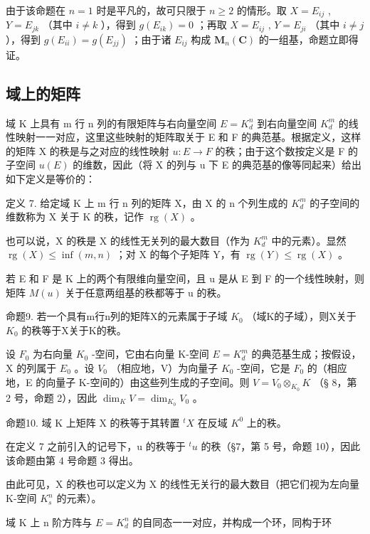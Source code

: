 由于该命题在 \(n = 1\) 时是平凡的，故可只限于 \(n \geqslant 2\) 的情形。取 \(X = E_{ij}\) , \(Y = E_{jk}\) （其中 \(i \neq k\) ），得到 \(g(E_{ik}) = 0\) ；再取 \(X = E_{ij}\) , \(Y = E_{ji}\) （其中 \(i \neq j\) ），得到 \(g(E_{ii}) = g(E_{jj})\) ；由于诸 \(E_{ij}\) 构成 \(\mathbf{M}_n(\mathbf{C})\) 的一组基，命题立即得证。

\subsection{域上的矩阵}

域 K 上具有 m 行 n 列的有限矩阵与右向量空间 \(E = K_{d}^{n}\) 到右向量空间 \(K_{d}^{m}\) 的线性映射一一对应，这里这些映射的矩阵取关于 E 和 F 的典范基。根据定义，这样的矩阵 X 的秩是与之对应的线性映射 \(u: E \to F\) 的秩；由于这个数按定义是 F 的子空间 \(u(E)\) 的维数，因此（将 X 的列与 u 下 E 的典范基的像等同起来）给出如下定义是等价的：

定义 7. 给定域 K 上 m 行 n 列的矩阵 X，由 X 的 n 个列生成的 \(K_{d}^{m}\) 的子空间的维数称为 X 关于 K 的秩，记作 \(\operatorname{rg}(X)\) 。

也可以说，X 的秩是 X 的线性无关列的最大数目（作为 \(K_{d}^{m}\) 中的元素）。显然 \(\operatorname{rg}(X) \leqslant \inf(m, n)\) ；对 X 的每个子矩阵 Y，有 \(\operatorname{rg}(Y) \leqslant \operatorname{rg}(X)\) 。

若 E 和 F 是 K 上的两个有限维向量空间，且 u 是从 E 到 F 的一个线性映射，则矩阵 \(M(u)\) 关于任意两组基的秩都等于 u 的秩。

命题9. 若一个具有m行n列的矩阵X的元素属于子域 \(K_{0}\) （域K的子域），则X关于 \(K_{0}\) 的秩等于X关于K的秩。

设 \(F_{0}\) 为右向量 \(K_{0}\) -空间，它由右向量 K-空间 \(E = K_{d}^{m}\) 的典范基生成；按假设，X 的列属于 \(E_{0}\) 。设 \(V_{0}\) （相应地，V）为向量子 \(K_{0}\) -空间，它是 \(F_{0}\) 的（相应地，E 的向量子 K-空间的）由这些列生成的子空间。则 \(V = V_{0} \otimes_{K_{0}} K\) （§ 8，第 2 号，命题 2），因此 \(\dim_{K} V = \dim_{K_{0}} V_{0}\) 。

命题10. 域 K 上矩阵 X 的秩等于其转置 \(^{t}X\) 在反域 \(K^{0}\) 上的秩。

在定义 7 之前引入的记号下，u 的秩等于 \({}^{t}u\) 的秩（§7，第 5 号，命题 10），因此该命题由第 4 号命题 3 得出。

由此可见，X 的秩也可以定义为 X 的线性无关行的最大数目（把它们视为左向量 K-空间 \(K_{s}^{n}\) 的元素）。

域 K 上 n 阶方阵与 \(E = K_{d}^{n}\) 的自同态一一对应，并构成一个环，同构于环

